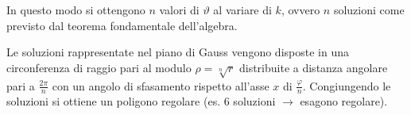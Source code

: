 \documentclass[a4paper]{article}
\begin{document}
In questo modo si ottengono \(n\) valori di \(\vartheta\) al variare di \(k\), ovvero \(n\) soluzioni come previsto dal teorema fondamentale dell'algebra.

Le soluzioni rappresentate nel piano di Gauss vengono disposte in una circonferenza di raggio pari al modulo \(\rho = \sqrt[n]{r}\) distribuite
a distanza angolare pari a \(\frac{2 \pi}{n}\) con un angolo di sfasamento rispetto all'asse \(x\) di \(\frac{\varphi}{n}\). 
Congiungendo le soluzioni si ottiene un poligono regolare (es. 6 soluzioni \(\to\) esagono regolare).

\newpage


\end{document}
